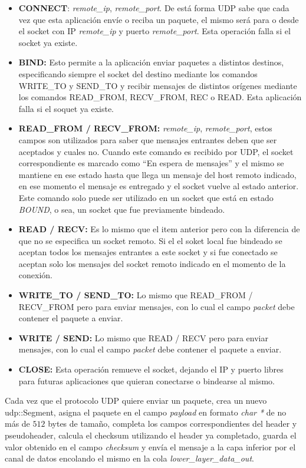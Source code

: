 \documentclass[10pt,a4paper]{article}
\begin{document}
\begin{itemize}
\item \textbf{CONNECT}: \textit{remote\_ip}, \textit{remote\_port}. De está forma UDP sabe que cada vez que esta aplicación envíe o reciba un paquete, el mismo será para o desde el socket con IP \textit{remote\_ip} y puerto \textit{remote\_port}. Esta operación falla si el socket ya existe.
\item \textbf{BIND:} Esto permite a la aplicación enviar paquetes a distintos destinos, especificando siempre el socket del destino mediante los comandos WRITE\_TO y SEND\_TO y recibir mensajes de distintos orígenes mediante los comandos READ\_FROM, RECV\_FROM, REC o READ. Esta aplicación falla si el soquet ya existe.
\item \textbf{READ\_FROM / RECV\_FROM:} \textit{remote\_ip}, \textit{remote\_port}, estos campos son utilizados para saber que mensajes entrantes deben que ser aceptados y cuales no. Cuando este comando es recibido por UDP, el socket correspondiente es marcado como ``En espera de mensajes'' y el mismo se mantiene en ese estado hasta que llega un mensaje del host remoto indicado, en ese momento el mensaje es entregado y el socket vuelve al estado anterior. Este comando solo puede ser utilizado en un socket que está en estado \textit{BOUND}, o sea, un socket que fue previamente bindeado.
\item \textbf{READ / RECV:} Es lo mismo que el item anterior pero con la diferencia de que no se especifica un socket remoto. Si el el soket local fue bindeado se aceptan todos los mensajes entrantes a este socket y si fue conectado se aceptan solo los mensajes del socket remoto indicado en el momento de la conexión.
\item \textbf{WRITE\_TO / SEND\_TO:} Lo mismo que READ\_FROM / RECV\_FROM pero para enviar mensajes, con lo cual el campo \textit{packet} debe contener el paquete a enviar.
\item \textbf{WRITE / SEND:} Lo mismo que READ / RECV pero para enviar mensajes, con lo cual el campo \textit{packet} debe contener el paquete a enviar.
\item \textbf{CLOSE:} Esta operación remueve el socket, dejando el IP y puerto libres para futuras aplicaciones que quieran conectarse o bindearse al mismo.
\end{itemize}

Cada vez que el protocolo UDP quiere enviar un paquete, crea un nuevo udp::Segment, asigna el paquete en el campo \textit{payload} en formato \textit{char *} de no más de $512$ bytes de tamaño, completa los campos correspondientes del header y pseudoheader, calcula el checksum utilizando el header ya completado, guarda el valor obtenido en el campo \textit{checksum} y envía el mensaje a la capa inferior por el canal de datos encolando el mismo en la cola \textit{lower\_layer\_data\_out}. \\
\end{document}
